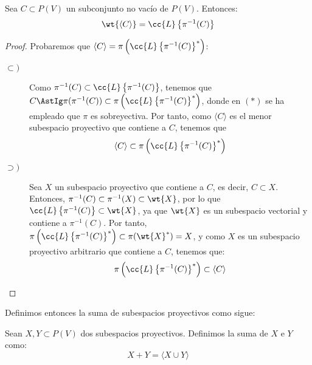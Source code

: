 \begin{prop}
    Sea $C\subset P(V)$ un subconjunto no vacío de $P(V)$. Entonces:
    \begin{equation*}
        \wt{\langle C \rangle} = \cc{L}\left\{\pi^{-1}(C)\right\}
    \end{equation*}
\end{prop}
\begin{proof}
    Probaremos que $\langle C \rangle = \pi\left(\cc{L}\left\{\pi^{-1}(C)\right\}^\ast\right)$:
    \begin{description}
        \item[$\subset)$] Como $\pi^{-1}(C)\subset \cc{L}\left\{\pi^{-1}(C)\right\}$, tenemos que
        $C\AstIg \pi(\pi^{-1}(C))\subset \pi\left(\cc{L}\left\{\pi^{-1}(C)\right\}^\ast\right)$, donde en $(\ast)$ se ha empleado que $\pi$ es sobreyectiva.
        Por tanto, como $\langle C \rangle$ es el menor subespacio proyectivo que contiene a $C$, tenemos que $$\langle C \rangle \subset \pi\left(\cc{L}\left\{\pi^{-1}(C)\right\}^\ast\right)$$

        \item[$\supset)$] Sea $X$ un subespacio proyectivo que contiene a $C$,
        es decir, $C\subset X$. Entonces, $\pi^{-1}(C)\subset \pi^{-1}(X)\subset \wt{X}$, por lo que
        $\cc{L}\left\{\pi^{-1}(C)\right\}\subset \wt{X}$, ya que $\wt{X}$ es un subespacio vectorial y contiene a $\pi^{-1}(C)$.
        Por tanto, $\pi\left(\cc{L}\left\{\pi^{-1}(C)\right\}^\ast\right)\subset \pi(\wt{X}^\ast)=X$,
        y como $X$ es un subespacio proyectivo arbitrario que contiene a $C$, tenemos que:
        \begin{equation*}
            \pi\left(\cc{L}\left\{\pi^{-1}(C)\right\}^\ast\right) \subset \langle C \rangle
        \end{equation*}
    \end{description}
\end{proof}

Definimos entonces la suma de subespacios proyectivos como sigue:
\begin{definicion}[Suma]
    Sean $X,Y\subset P(V)$ dos subespacios proyectivos. Definimos la suma de $X$ e $Y$ como:
    \begin{equation*}
        X+Y = \langle X\cup Y\rangle
    \end{equation*}
\end{definicion}

